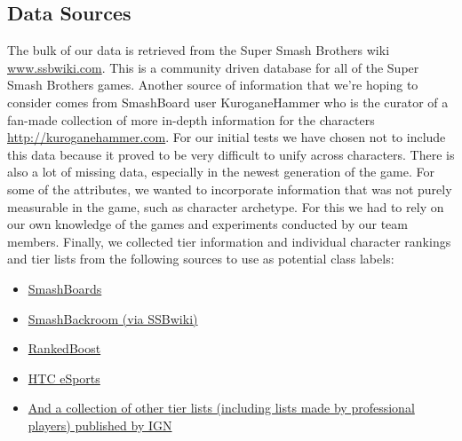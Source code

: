 \documentclass{article}
\begin{document}
\subsection{Data Sources}
The bulk of our data is retrieved from the Super Smash Brothers wiki \url{www.ssbwiki.com}. This is a community driven database for all of the Super Smash Brothers games. Another source of information that we’re hoping to consider comes from SmashBoard user KuroganeHammer who is the curator of a fan-made collection of more in-depth information for the characters \url{http://kuroganehammer.com}. For our initial tests we have chosen not to include this data because it proved to be very difficult to unify across characters. There is also a lot of missing data, especially in the newest generation of the game.
For some of the attributes, we wanted to incorporate information that was not purely measurable in the game, such as character archetype. For this we had to rely on our own knowledge of the games and experiments conducted by our team members.
Finally, we collected tier information and individual character rankings and tier lists from the following sources to use as potential class labels:
\begin{itemize}
  \item\href{https://smashboards.com/threads/4br-smash-for-wii-u-tier-list-v4.452109/}{SmashBoards}
  \item\href{https://www.ssbwiki.com/List\_of\_SSB4\_tier\_lists\_(NTSC)}{SmashBackroom (via SSBwiki)}
  \item\href{https://rankedboost.com/ssb4-tier-list/}{RankedBoost}
  \item\href{https://esports.htc.com/articles/esports-tier-list}{HTC eSports}
  \item\href{https://www.ign.com/wikis/super-smash-bros-ultimate/Tier\_Lists}{And a collection of other tier lists (including lists made by professional players) published by IGN}
 \end{itemize}
\end{document}
